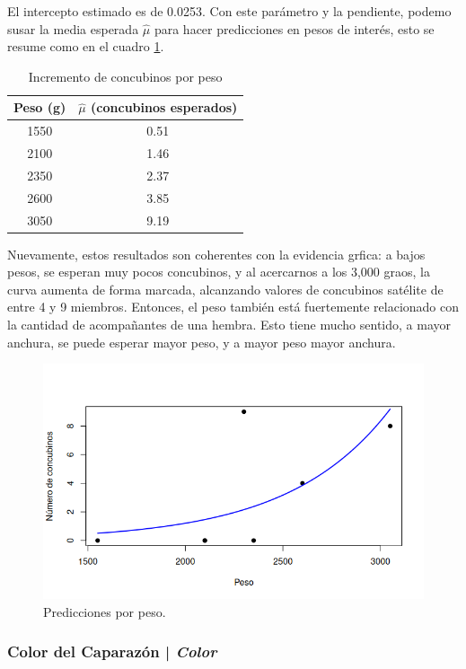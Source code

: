 El intercepto estimado es de 0.0253. Con este parámetro y la pendiente, podemo susar la media esperada $\hat{\mu}$
para hacer predicciones en pesos de interés, esto se resume como en el cuadro \ref{tab:peso-concubinos}.

\begin{table}[h!]
    \centering
    \begin{tabular}{|c|c|}
        \hline
        \textbf{Peso (g)} & \textbf{$\hat{\mu}$ (concubinos esperados)} \\
        \hline
        1550 & 0.51 \\
        \hline
        2100 & 1.46 \\
        \hline
        2350 & 2.37 \\
        \hline
        2600 & 3.85 \\
        \hline
        3050 & 9.19 \\
        \hline
    \end{tabular}
    \caption{Incremento de concubinos por peso}
    \label{tab:peso-concubinos}
\end{table}

Nuevamente, estos resultados son coherentes con la evidencia grfica: a bajos pesos, se esperan muy pocos 
concubinos, y al acercarnos a los 3,000 graos, la curva aumenta de forma marcada, alcanzando valores de
concubinos satélite de entre 4 y 9 miembros. Entonces, el peso también está fuertemente relacionado
con la cantidad de acompañantes de una hembra. Esto tiene mucho sentido, a mayor anchura, se puede 
esperar mayor peso, y a mayor peso mayor anchura.

\begin{figure}[h!]
    \centering
    \includegraphics[width=0.7\linewidth]{Images/peso-capa.png}
    \caption{Predicciones por peso.}
    \label{fig:peso-capa}
\end{figure}

\subsubsection{Color del Caparazón | \textit{Color}}

